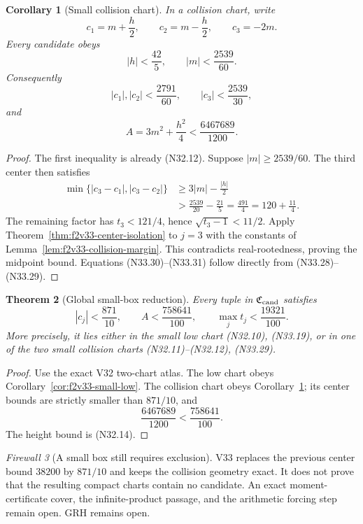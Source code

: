 \documentclass[11pt]{article}
\newtheorem{theorem}{Theorem}[section]
\newtheorem{corollary}[theorem]{Corollary}
\theoremstyle{definition}
\theoremstyle{remark}
\newtheorem{firewall}[theorem]{Firewall}
\begin{document}
\begin{corollary}[Small collision chart]
\label{cor:f2v33-small-collision}
In a collision chart, write
\[
 c_1=m+\frac h2,\qquad c_2=m-\frac h2,\qquad c_3=-2m.
 \tag{N33.28}
\]
Every candidate obeys
\[
 \boxed{
 |h|<\frac{42}{5},\qquad
 |m|<\frac{2539}{60}.}
 \tag{N33.29}
\]
Consequently
\[
 |c_1|,|c_2|<\frac{2791}{60},\qquad
 |c_3|<\frac{2539}{30},
 \tag{N33.30}
\]
and
\[
 A=3m^2+\frac{h^2}{4}
 <\frac{6467689}{1200}.
 \tag{N33.31}
\]
\end{corollary}

\begin{proof}
The first inequality is already \textup{(N32.12)}.  Suppose
\(|m|\geq2539/60\).  The third center then satisfies
\[
\begin{aligned}
 \min\{|c_3-c_1|,|c_3-c_2|\}
 &\geq3|m|-\frac{|h|}{2}\\
 &>\frac{2539}{20}-\frac{21}{5}
 =\frac{491}{4}
 =120+\frac{11}{4}.
\end{aligned}
\tag{N33.32}
\]
The remaining factor has \(t_3<121/4\), hence
\(\sqrt{t_3-1}<11/2\).  Apply
Theorem~\ref{thm:f2v33-center-isolation} to \(j=3\) with the constants
of Lemma~\ref{lem:f2v33-collision-margin}.  This contradicts
real-rootedness, proving the midpoint bound.  Equations
\textup{(N33.30)}--\textup{(N33.31)} follow directly from
\textup{(N33.28)}--\textup{(N33.29)}.
\end{proof}

\begin{theorem}[Global small-box reduction]
\label{thm:f2v33-global-small-box}
Every tuple in \(\mathfrak C_{\rm cand}\) satisfies
\[
 \boxed{
 |c_j|<\frac{871}{10},\qquad
 A<\frac{758641}{100},\qquad
 \max_jt_j<\frac{19321}{100}.}
 \tag{N33.33}
\]
More precisely, it lies either in the small low chart
\textup{(N32.10)}, \textup{(N33.19)}, or in one of the two small
collision charts \textup{(N32.11)}--\textup{(N32.12)},
\textup{(N33.29)}.
\end{theorem}

\begin{proof}
Use the exact V32 two-chart atlas.  The low chart obeys
Corollary~\ref{cor:f2v33-small-low}.  The collision chart obeys
Corollary~\ref{cor:f2v33-small-collision}; its center bounds are strictly
smaller than \(871/10\), and
\[
 \frac{6467689}{1200}<\frac{758641}{100}.
 \tag{N33.34}
\]
The height bound is \textup{(N32.14)}.
\end{proof}

\begin{firewall}[A small box still requires exclusion]
\label{fire:f2v33}
V33 replaces the previous center bound \(38200\) by \(871/10\) and keeps
the collision geometry exact.  It does not prove that the resulting
compact charts contain no candidate.  An exact moment-certificate cover,
the infinite-product passage, and the arithmetic forcing step remain open.
GRH remains open.
\end{firewall}
\end{document}
